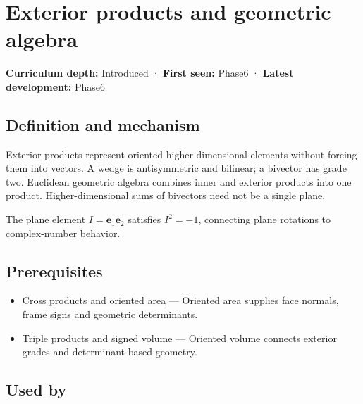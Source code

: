\hypertarget{appendix-e1960925d1b8}{}\label{referencestart:appendix-e1960925d1b8}
\section{Exterior products and geometric algebra}\label{appendix-e1960925d1b8-exterior-products-and-geometric-algebra}

\textbf{Curriculum depth:} Introduced · \textbf{First seen:} Phase6 · \textbf{Latest development:} Phase6

\begin{allmightroledefinition}

\subsection{Definition and mechanism}\label{appendix-e1960925d1b8-definition-and-mechanism}

Exterior products represent oriented higher-dimensional elements without forcing them into vectors. A wedge is antisymmetric and bilinear; a bivector has grade two. Euclidean geometric algebra combines inner and exterior products into one product. Higher-dimensional sums of bivectors need not be a single plane.

\end{allmightroledefinition}

The plane element \(I=\mathbf e_1\mathbf e_2\) satisfies \(I^2=-1\), connecting plane rotations to complex-number behavior.

\subsection{Prerequisites}\label{appendix-e1960925d1b8-prerequisites}

\begin{itemize}
\tightlist
\item
  \hyperref[appendix-2391db8052b1]{Cross products and oriented area} --- Oriented area supplies face normals, frame signs and geometric determinants.
\item
  \hyperref[appendix-5caa058bd9c7]{Triple products and signed volume} --- Oriented volume connects exterior grades and determinant-based geometry.
\end{itemize}

\subsection{Used by}\label{appendix-e1960925d1b8-used-by}


